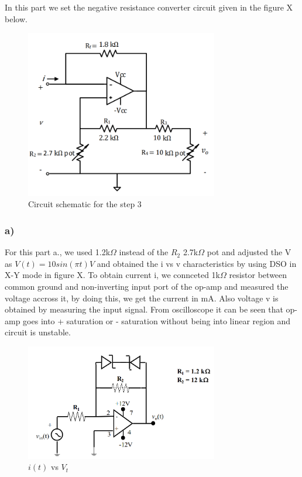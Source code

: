 \documentclass[letterpaper,12pt]{article}
\begin{document}
In this part we set the negative resistance converter circuit given in the figure X below.
\begin{figure}[H]
    \centering
    \includegraphics[width = 0.75\textwidth]{3SCH.png}
    \caption{Circuit schematic for the step 3}
\end{figure} 

  
\subsubsection{a)}
For this part a., we used 1.2k\(\Omega\) instead of the \(R_2\) 2.7k\(\Omega\) pot and adjusted the V as \(V(t) = 10sin(\pi t)V\) and obtained the i vs v characteristics by using DSO in X-Y mode in figure X. To obtain current i, we connceted 1k\(\Omega\) resistor between common ground and non-inverting input port of the op-amp and measured the voltage accross it, by doing this, we get the current in mA. Also voltage v is obtained by measuring the input signal. From oscilloscope it can be seen that op-amp goes into + saturation or - saturation without being into linear region and circuit is unstable.
\begin{figure}[H]
    \centering
    \includegraphics[width = 0.75\textwidth]{2SCH.png}
    \caption{\(i(t)\) vs \(V_{t}\)}
\end{figure} 
\end{document}
